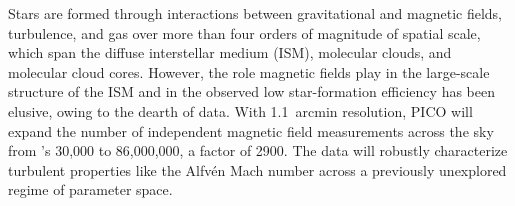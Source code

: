 \documentclass[PICOAPC.tex]{subfiles}
\begin{document}
Stars are formed through interactions between gravitational and magnetic fields, turbulence, and gas over more than four orders of magnitude of spatial scale, which span the diffuse interstellar medium (ISM), molecular clouds, and molecular cloud cores. However, the role magnetic fields play in the large-scale structure of the ISM and in the observed low star-formation efficiency has been elusive, owing to the dearth of data. 
With 1.1~arcmin resolution, PICO will expand the number of independent magnetic field measurements across the sky from \planck 's  30,000 to 86,000,000, a factor of 2900. The data will robustly characterize turbulent properties like the Alfv\'{e}n Mach number across a previously unexplored regime of parameter space. 
\end{document}
